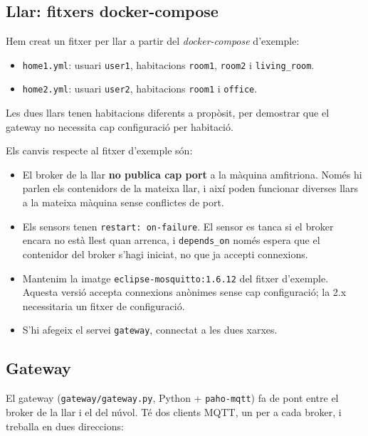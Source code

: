 \documentclass[11pt,a4paper]{article}
\begin{document}
\subsection{Llar: fitxers docker-compose}

Hem creat un fitxer per llar a partir del \emph{docker-compose} d'exemple:
\begin{itemize}
  \item \texttt{home1.yml}: usuari \texttt{user1}, habitacions
        \texttt{room1}, \texttt{room2} i \texttt{living\_room}.
  \item \texttt{home2.yml}: usuari \texttt{user2}, habitacions
        \texttt{room1} i \texttt{office}.
\end{itemize}
Les dues llars tenen habitacions diferents a propòsit, per demostrar que el
gateway no necessita cap configuració per habitació.

Els canvis respecte al fitxer d'exemple són:
\begin{itemize}
  \item El broker de la llar \textbf{no publica cap port} a la màquina
        amfitriona. Només hi parlen els contenidors de la mateixa llar, i així
        poden funcionar diverses llars a la mateixa màquina sense conflictes
        de port.
  \item Els sensors tenen \texttt{restart: on-failure}. El sensor es tanca si
        el broker encara no està llest quan arrenca, i \texttt{depends\_on}
        només espera que el contenidor del broker s'hagi iniciat, no que ja
        accepti connexions.
  \item Mantenim la imatge \texttt{eclipse-mosquitto:1.6.12} del fitxer
        d'exemple. Aquesta versió accepta connexions anònimes sense cap
        configuració; la 2.x necessitaria un fitxer de configuració.
  \item S'hi afegeix el servei \texttt{gateway}, connectat a les dues xarxes.
\end{itemize}

\subsection{Gateway}\label{sec:gateway}

El gateway (\texttt{gateway/gateway.py}, Python + \texttt{paho-mqtt}) fa de
pont entre el broker de la llar i el del núvol. Té dos clients MQTT, un per a
cada broker, i treballa en dues direccions:
\end{document}
